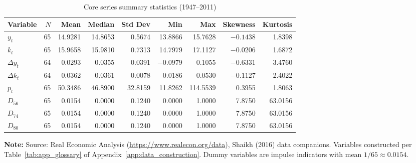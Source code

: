 \begin{longtable}[t]{lrrrrrrrr}
\caption{Core series summary statistics (1947--2011)}\label{tab:app_summary_stats}\\
\toprule
Variable & $N$ & Mean & Median & Std Dev & Min & Max & Skewness & Kurtosis \\
\midrule
$y_t$ & 65 & 14.9281 & 14.8653 & 0.5674 & 13.8866 & 15.7628 & $-0.1438$ & 1.8398 \\
$k_t$ & 65 & 15.9658 & 15.9810 & 0.7313 & 14.7979 & 17.1127 & $-0.0206$ & 1.6872 \\
$\Delta y_t$ & 64 & 0.0293 & 0.0355 & 0.0391 & $-0.0979$ & 0.1055 & $-0.6331$ & 3.4760 \\
$\Delta k_t$ & 64 & 0.0362 & 0.0361 & 0.0078 & 0.0186 & 0.0530 & $-0.1127$ & 2.4022 \\
$p_t$ & 65 & 50.3486 & 46.8900 & 32.8159 & 11.8262 & 114.5539 & 0.3955 & 1.8063 \\
\addlinespace
$D_{56}$ & 65 & 0.0154 & 0.0000 & 0.1240 & 0.0000 & 1.0000 & 7.8750 & 63.0156 \\
$D_{74}$ & 65 & 0.0154 & 0.0000 & 0.1240 & 0.0000 & 1.0000 & 7.8750 & 63.0156 \\
$D_{80}$ & 65 & 0.0154 & 0.0000 & 0.1240 & 0.0000 & 1.0000 & 7.8750 & 63.0156 \\
\bottomrule
\end{longtable}
\noindent\footnotesize\textbf{Note:} Source: Real Economic Analysis (\url{https://www.realecon.org/data}), Shaikh (2016) data companions. Variables constructed per Table~\ref{tab:app_glossary} of Appendix~\ref{app:data_construction}. Dummy variables are impulse indicators with mean $1/65 \approx 0.0154$.
